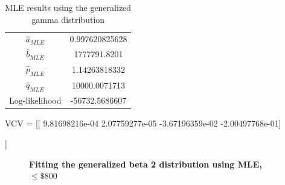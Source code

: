 \documentclass[letterpaper,12pt]{article}
\theoremstyle{definition}
\begin{document}
\begin{table}[h!]
 \centering
 \caption{MLE results using the generalized gamma distribution}
 \begin{tabular}{|c | c |} 
  \hline
  $\hat{a}_{MLE}$ & 0.997620825628 \\ 
  $\hat{b}_{MLE}$ & 1777791.8201 \\
  $\hat{p}_{MLE}$ & 1.14263818332\\
  $\hat{q}_{MLE}$ & 10000.0071713\\
  Log-likelihood & -56732.5686607\\
  \hline
  \end{tabular}
\end{table}
\par
VCV =  [[  9.81698216e-04   2.07759277e-05  -3.67196359e-02  -2.00497768e-01] \par
 [  2.07759277e-05   1.00000218e+00  -9.06265796e-04  -1.81943579e-02] \par
 [ -3.67196359e-02  -9.06265796e-04   1.37532955e+00   7.55027607e+00]\par
 [ -2.00497768e-01  -1.81943579e-02   7.55027607e+00   1.52595436e+02]]
 \par

\begin{figure}[H]\centering\captionsetup{width=4.0in}
  \caption{\textbf{Fitting the generalized beta 2 distribution using MLE, $\leq \$800$}}
\end{figure}
\par\bigskip
\end{document}
